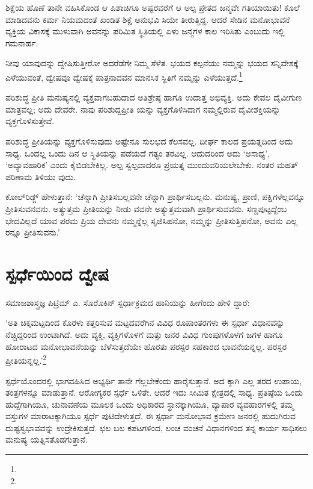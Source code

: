ಶಿಕ್ಷೆಯ ಹೊಣೆ ತಾನೇ ವಹಿಸಿಕೊಂಡ ಆ ಪಿಶಾಚಿಗೂ ಅಷ್ಟರವರೆಗೆ ಆ ಅಲ್ಪ ಪ್ರೇತದ ಜನ್ಮವೇ ಗತಿಯಾಯಿತು! ಕೊಲೆ ಮಾಡಿದವನು ಕರ್ಮ ನಿಯಮದಂತೆ ಖಂಡಿತ ಶಿಕ್ಷೆ ಅನುಭವಿ ಸಿಯೇ ತೀರುತ್ತಿದ್ದ. ಆದರೆ ಸೇಡಿನ ಮನೋಭಾವನೆ ವ್ಯಕ್ತಿಯ ವಿಕಾಸಕ್ಕೆ ಮುಳುವಾಗಿ ಅವನನ್ನು ಪರಿಮಿತ ಸ್ಥಿತಿಯಲ್ಲಿ ಏಳು ಜನ್ಮಗಳ ಕಾಲ ಇರಿಸಿತು ಎಂಬುದು ಇಲ್ಲಿ ಗಮನಾರ್ಹ.

ನೀವು ಯಾವುದನ್ನು ದ್ವೇಷಿಸುತ್ತೀರೋ ಅದರೆಡೆಗೇ ನಿಮ್ಮ ಸೆಳೆತ. ಭಯದ ಕಲ್ಪನೆಯು ನಮ್ಮನ್ನು ಭಯದ ಸನ್ನಿವೇಶಕ್ಕೆ ಎಳೆಯುವಂತೆ, ದ್ವೇಷವೂ ದ್ವೇಷಕ್ಕೆ ಪಾತ್ರನಾದವನ ಮಾನಸಿಕ ಸ್ಥಿತಿಗೆ ನಮ್ಮನ್ನು ಎಳೆಯುತ್ತದೆ.\footnote{\hfill{}}

ಪರಿಶುದ್ಧ ಪ್ರೀತಿ ಮನುಷ್ಯನಲ್ಲಿ ವ್ಯಕ್ತವಾಗಬಹುದಾದ ಅತಿಶ್ರೇಷ್ಠ ಹಾಗೂ ಉದಾತ್ತ ಅಭಿವ್ಯಕ್ತಿ. ಅದು ಕೇವಲ ದೈವೀಗುಣ ಮಾತ್ರವಲ್ಲ; ಅದು ದೇವರೇ. ನಾವು ಪರಿಶುದ್ದಪ್ರೀತಿ ಯನ್ನು ವ್ಯಕ್ತಗೊಳಿಸಿದಾಗ ನಮ್ಮಲ್ಲಿರುವ ದೈವೀಶಕ್ತಿಯನ್ನು ವ್ಯಕ್ತಗೊಳಿಸುತ್ತೇವೆ.

ಪರಿಶುದ್ಧ ಪ್ರೀತಿಯನ್ನು ವ್ಯಕ್ತಗೊಳಿಸುವುದು ಅಷ್ಟೇನೂ ಸುಲಭದ ಕೆಲಸವಲ್ಲ. ದೀರ್ಘ ಕಾಲದ ಪ್ರಯತ್ನದಿಂದ ಅದು ಸಾಧ್ಯ. ಒಂದಲ್ಲ ಒಂದು ದಿನ ಆ ಸ್ಥಿತಿಯನ್ನು ಪಡೆಯದೆ ಗತ್ಯಂ ತರವಿಲ್ಲ. ಆದುದರಿಂದ ಅದು ‘ಅಸಾಧ್ಯ’, ‘ಅವ್ಯಾವಹಾರಿಕ’ ಎಂದು ಕೈಬಿಡಬೇಕಿಲ್ಲ. ಅಲ್ಪ ಸ್ವಲ್ಪವಾದರೂ ಪ್ರಯತ್ನ ಮುಂದುವರಿಯಲೇಬೇಕು. ನಂತರ ಮಹತ್ ಪರಿಣಾಮ ತಿಳಿಯು ವುದು.

ಕೋಲ್​ರಿಡ್ಜ್ ಹೇಳುತ್ತಾನೆ: ‘ಚೆನ್ನಾಗಿ ಪ್ರೀತಿಸಬಲ್ಲವನೇ ಚೆನ್ನಾಗಿ ಪ್ರಾರ್ಥಿಸಬಲ್ಲನು. ಮನುಷ್ಯ, ಪ್ರಾಣಿ, ಪಕ್ಷಿಗಳೆಲ್ಲವನ್ನೂ ಪ್ರೀತಿಸುವನವನು. ಅತ್ಯುತ್ತಮ ಪ್ರೀತಿಯನ್ನು ನೀಡು ವವನೇ ಅತ್ಯುತ್ತಮವಾಗಿ ಪ್ರಾರ್ಥಿಸುವವನು. ಸಣ್ಣಪುಟ್ಟದ್ದೆಂಬ ಭೇದವಿಲ್ಲದೆ ಯಾವ ಪರಮ ಪ್ರಿಯ ದೇವನು ನಮ್ಮನ್ನೆಲ್ಲ ಸೃಜಿಸಿಹನೋ, ನಮ್ಮನ್ನು ಪ್ರೀತಿಸುತ್ತಿಹನೋ, ಅವನು ಎಲ್ಲ ರನ್ನೂ ಪ್ರೀತಿಸುವನು.’


\section{ಸ್ಪರ್ಧೆಯಿಂದ ದ್ವೇಷ}

ಸಮಾಜಶಾಸ್ತ್ರಜ್ಞ ಪಿಟ್ರಿಮ್ ಎ. ಸೊರೊಕಿನ್ ಸ್ಪರ್ಧಾಕ್ರಮದ ಹಾನಿಯನ್ನು ಹೀಗೆಂದು ಹೇಳಿ ದ್ದಾರೆ:

‘ಅತಿ ಚಿಕ್ಕಮಟ್ಟದಿಂದ ಕೊರಳು ಕತ್ತರಿಸುವ ಮಟ್ಟದವರೆಗಿನ ವಿವಿಧ ರೂಪಾಂತರಗಳು ಈ ಸ್ಪರ್ಧಾ ವಿಧಾನವನ್ನು ನೆಚ್ಚಿದ್ದರಿಂದ ಉಂಟಾಗಿದೆ. ಅದು ವ್ಯಕ್ತಿ, ವ್ಯಕ್ತಿಗಳೊಳಗೆ ಮತ್ತು ಜನರ ವಿವಿಧ ಗುಂಪುಗಳೊಳಗೆ ಜಗಳ ಹಾಗೂ ಹೋರಾಟದ ಮನೋಭಾವನೆಯನ್ನು ಬೆಳೆಸುತ್ತದೆಯೇ ಹೊರತು ಪರಸ್ಪರ ಸಹಕಾರದ ಭಾವನೆಯನ್ನಲ್ಲ. ಪರಸ್ಪರ ಪ್ರೀತಿಯನ್ನಲ್ಲ.’\footnote{\hfill{}}

ಸ್ಪರ್ಧೆಯೊಂದರಲ್ಲಿ ಭಾಗವಹಿಸಿದ ಅಭ್ಯರ್ಥಿ ತಾನೇ ಗೆಲ್ಲಬೇಕೆಂದು ಹಾರೈಸುತ್ತಾನೆ. ಅದ ಕ್ಕಾಗಿ ಎಲ್ಲ ತರದ ಉಪಾಯ, ತಂತ್ರಗಳನ್ನೂ ಮಾಡುತ್ತಾನೆ. ಆರೋಗ್ಯಕರ ಸ್ಪರ್ಧೆ ಒಳಿತೇ. ಆದರೆ ಇದು ಸೀಮಿತ ಕ್ಷೇತ್ರದಲ್ಲಿ ಸಾಧ್ಯ. ಪ್ರತಿಷ್ಠೆಯ ಒಂದು ಹುದ್ದೆಗಾಗಿಯೂ, ಚುನಾವಣೆಯ ಮೂಲಕ ಒಂದು ಅಧಿಕಾರದ ಸ್ಥಾನಕ್ಕಾಗಿಯೂ, ವ್ಯಾಪಾರ ವ್ಯವಹಾರಗಳಲ್ಲಿ ತಮ್ಮ ವಸ್ತುಗಳ ಮಾರಾಟಕ್ಕಾಗಿಯೂ ಸ್ಪರ್ಧೆ ಪುಟಿದೇಳುತ್ತದೆ. ಈ ಸ್ಪರ್ಧಾ ಮನೋಭಾವ ಕ್ರಮೇಣ ಜನರಲ್ಲಿ ಹುದುಗಿರುವ ದುಷ್ಟಸ್ವಭಾವವನ್ನು ಉದ್ರೇಕಿಸುತ್ತದೆ. ಛಲ ಬಲ ಕಪಟಗಳಿಂದ, ಲಂಚ ವಂಚನೆ ವಿಧಾನಗಳಿಂದ ತನ್ನ ಕಾರ್ಯ ಸಾಧಿಸಲು ಮನುಷ್ಯ ಯತ್ನಿಸತೊಡಗುತ್ತಾನೆ.

